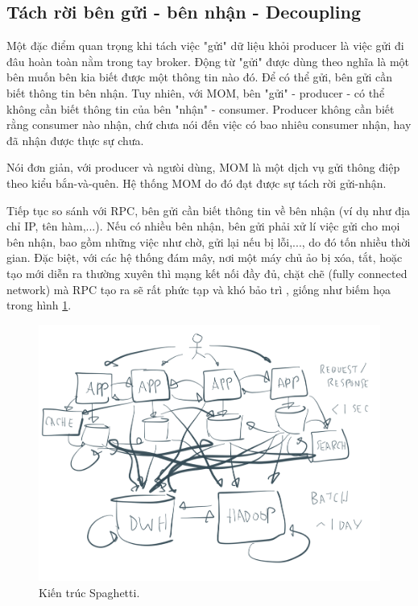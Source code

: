 \documentclass{article}
\begin{document}
\subsection{Tách rời bên gửi - bên nhận - Decoupling}

Một đặc điểm quan trọng khi tách việc "gửi" dữ liệu khỏi producer là việc gửi đi
đâu hoàn toàn nằm trong tay broker. Động từ "gửi" được dùng theo nghĩa là một
bên muốn bên kia biết được một thông tin nào đó. Để có thể gửi, bên gửi cần biết
thông tin bên nhận. Tuy nhiên, với MOM, bên "gửi" - producer -  có thể không cần
biết thông tin của bên "nhận" - consumer. Producer không cần biết rằng consumer
nào nhận, chứ chưa nói đến việc có bao nhiêu consumer nhận, hay đã nhận được
thực sự chưa.

Nói đơn giản, với producer và ngưòi dùng, MOM là một dịch vụ gửi thông điệp theo
kiểu bắn-và-quên. Hệ thống MOM do đó đạt được sự tách rời gửi-nhận.

Tiếp tục so sánh với RPC, bên gửi cần biết thông tin về bên nhận (ví dụ như địa
chỉ IP, tên hàm,...). Nếu có nhiều bên nhận, bên gửi phải xử lí việc gửi cho mọi
bên nhận, bao gồm những việc như chờ, gửi lại nếu bị lỗi,..., do đó tốn nhiều
thời gian. Đặc biệt, với các hệ thống đám mây, nơi một máy chủ ảo bị xóa, tắt,
hoặc tạo mới diễn ra thường xuyên thì mạng kết nối đầy đủ, chặt chẽ (fully
connected network) mà RPC tạo ra sẽ rất phức tạp và khó bảo trì
\cite{Kleppmann17C}, giống như biếm họa trong hình
\ref{spaghetti_architectures}.

\begin{figure}[H]
    \includegraphics[scale=0.5]{spaghetti_architectures.png}
    \centering
    \caption{Kiến trúc Spaghetti\texttrademark \cite{confluent2018}.}
    \label{spaghetti_architectures}
\end{figure}
\end{document}
